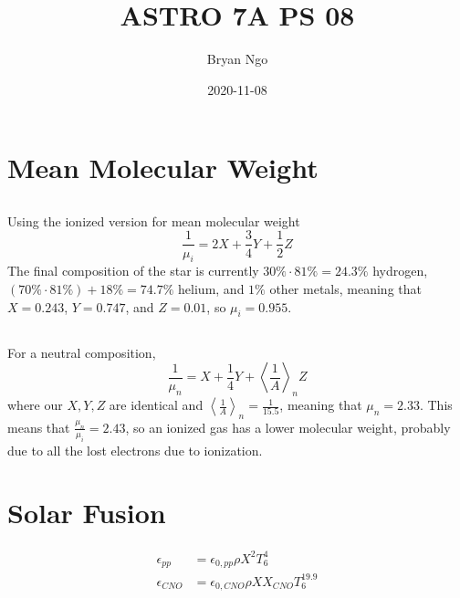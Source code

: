 \documentclass{article}
\title{ASTRO 7A PS 08}
\author{Bryan Ngo}
\date{2020-11-08}
\begin{document}
\maketitle

\section{Mean Molecular Weight}

\subsection{}

Using the ionized version for mean molecular weight
\begin{equation}
    \frac{1}{\mu_i} = 2X + \frac{3}{4}Y + \frac{1}{2}Z
\end{equation}
The final composition of the star is currently \(30\% \cdot 81\% = 24.3\%\) hydrogen, \((70\% \cdot 81\%) + 18\% = 74.7\%\) helium, and \(1\%\) other metals, meaning that \(X = 0.243\), \(Y = 0.747\), and \(Z = 0.01\), so \(\mu_i = \num{0.955}\).

\subsection{}

For a neutral composition,
\begin{equation}
    \frac{1}{\mu_n} = X + \frac{1}{4}Y + \left\langle\frac{1}{A}\right\rangle_n Z
\end{equation}
where our \(X, Y, Z\) are identical and \(\left\langle\frac{1}{A}\right\rangle_n = \frac{1}{15.5}\), meaning that \(\mu_n = \num{2.33}\).
This means that \(\frac{\mu_n}{\mu_i} = \num{2.43}\), so an ionized gas has a lower molecular weight, probably due to all the lost electrons due to ionization.

\section{Solar Fusion}

\begin{align}
    \epsilon_{pp} &= \epsilon_{0, pp} \rho X^2 T_6^4 \\
    \epsilon_{CNO} &= \epsilon_{0, CNO} \rho X X_{CNO} T_6^{19.9}
\end{align}

\subsection{}
\end{document}
